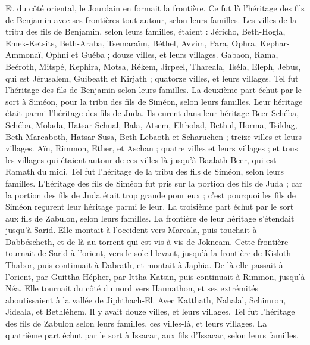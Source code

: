 \begin{multicols}{2}
Et du côté oriental, le Jourdain en formait la frontière. Ce fut là l’héritage des fils de Benjamin avec ses frontières tout autour, selon leurs familles.
Les villes de la tribu des fils de Benjamin, selon leurs familles, étaient : Jéricho, Beth-Hogla, Emek-Ketsits,
Beth-Araba, Tsemaraïm, Béthel,
Avvim, Para, Ophra,
Kephar-Ammonaï, Ophni et Guéba ; douze villes, et leurs villages.
Gabaon, Rama, Beéroth,
Mitspé, Kephira, Motsa,
Rékem, Jirpeel, Thareala,
Tséla, Eleph, Jebus, qui est Jérusalem, Guibeath et Kirjath ; quatorze villes, et leurs villages. Tel fut l’héritage des fils de Benjamin selon leurs familles.
\VerseOne{}La deuxième part échut par le sort à Siméon, pour la tribu des fils de Siméon, selon leurs familles. Leur héritage était parmi l’héritage des fils de Juda.
Ils eurent dans leur héritage Beer-Schéba, Schéba, Molada,
Hatsar-Schual, Bala, Atsem,
Eltholad, Bethul, Horma,
Tsiklag, Beth-Marcaboth, Hatsar-Susa,
Beth-Lebaoth et Scharuchen ; treize villes et leurs villages.
Aïn, Rimmon, Ether, et Aschan ; quatre villes et leurs villages ;
et tous les villages qui étaient autour de ces villes-là jusqu’à Baalath-Beer, qui est Ramath du midi. Tel fut l’héritage de la tribu des fils de Siméon, selon leurs familles.
L’héritage des fils de Siméon fut pris sur la portion des fils de Juda ; car la portion des fils de Juda était trop grande pour eux ; c’est pourquoi les fils de Siméon reçurent leur héritage parmi le leur.
La troisième part échut par le sort aux fils de Zabulon, selon leurs familles.
La frontière de leur héritage s’étendait jusqu’à Sarid. Elle montait à l’occident vers Mareala, puis touchait à Dabbéscheth, et de là au torrent qui est vis-à-vis de Jokneam.
Cette frontière tournait de Sarid à l’orient, vers le soleil levant, jusqu’à la frontière de Kisloth-Thabor, puis continuait à Dabrath, et montait à Japhia.
De là elle passait à l’orient, par Guittha-Hépher, par Ittha-Katsin, puis continuait à Rimmon, jusqu’à Néa.
Elle tournait du côté du nord vers Hannathon, et ses extrémités aboutissaient à la vallée de Jiphthach-El.
Avec Katthath, Nahalal, Schimron, Jideala, et Bethléhem. Il y avait douze villes, et leurs villages.
Tel fut l’héritage des fils de Zabulon selon leurs familles, ces villes-là, et leurs villages.
La quatrième part échut par le sort à Issacar, aux fils d’Issacar, selon leurs familles.

\end{multicols}
